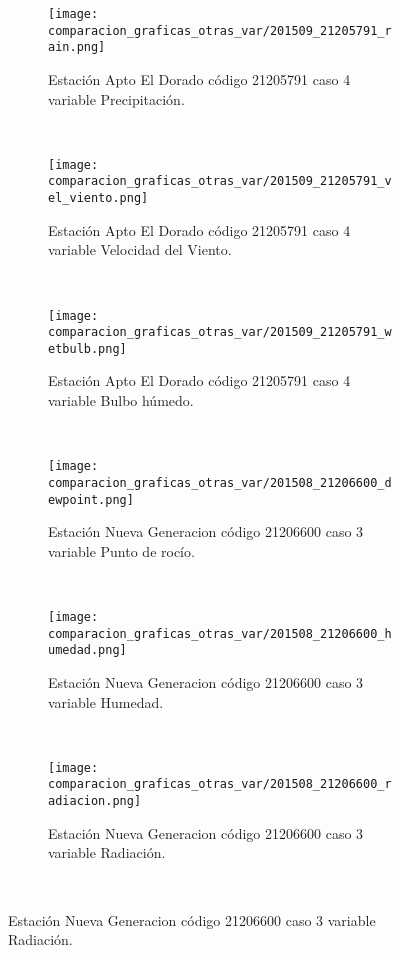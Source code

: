 \begin{figure}[H]
\centering
\begin{subfigure}[normla]{0.4\textwidth}
\caption{Estación Apto El Dorado código 21205791 caso 4 variable Precipitación.}
\texttt{[image: comparacion\_graficas\_otras\_var/201509\_21205791\_rain.png]}
\end{subfigure}
~
\begin{subfigure}[normla]{0.4\textwidth}
\caption{Estación Apto El Dorado código 21205791 caso 4 variable Velocidad del Viento.}
\texttt{[image: comparacion\_graficas\_otras\_var/201509\_21205791\_vel\_viento.png]}
\end{subfigure}
~
\begin{subfigure}[normla]{0.4\textwidth}
\caption{Estación Apto El Dorado código 21205791 caso 4 variable Bulbo húmedo.}
\texttt{[image: comparacion\_graficas\_otras\_var/201509\_21205791\_wetbulb.png]}
\end{subfigure}
~
\begin{subfigure}[normla]{0.4\textwidth}
\caption{Estación Nueva Generacion código 21206600 caso 3 variable Punto de rocío.}
\texttt{[image: comparacion\_graficas\_otras\_var/201508\_21206600\_dewpoint.png]}
\end{subfigure}
~
\begin{subfigure}[normla]{0.4\textwidth}
\caption{Estación Nueva Generacion código 21206600 caso 3 variable Humedad.}
\texttt{[image: comparacion\_graficas\_otras\_var/201508\_21206600\_humedad.png]}
\end{subfigure}
~
\begin{subfigure}[normla]{0.4\textwidth}
\caption{Estación Nueva Generacion código 21206600 caso 3 variable Radiación.}
\texttt{[image: comparacion\_graficas\_otras\_var/201508\_21206600\_radiacion.png]}
\end{subfigure}
~
\end{figure}
           
